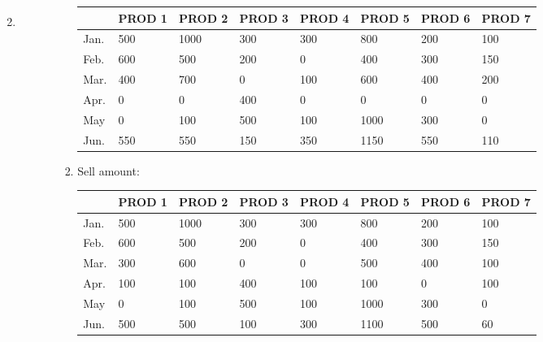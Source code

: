 \documentclass[12pt,a4paper]{article}
\makeatletter
\newtheorem*{solution}{Solution}
\theoremstyle{definition}
\renewenvironment{solution}[1][Solution] {\par\pushQED{\qed}\normalfont\topsep6\p@\@plus6\p@\relax\trivlist\item[\hskip\labelsep\bfseries#1\@addpunct{.}]\ignorespaces}{\popQED\endtrivlist\@endpefalse} \makeatother
\makeatother
\begin{document}
\begin{enumerate}
\begin{solution}
\begin{enumerate}
\begin{enumerate}
\begin{enumerate}
					\begin{table}[htbp]
						\scriptsize
						\centering
						\renewcommand\arraystretch{1.1}
						\begin{tabular}{m{} m{0.09\textwidth}<{\centering} m{}<{\centering} m{}<{\centering} m{}<{\centering} m{}<{\centering} m{}<{\centering} m{}<{\centering}}
							\hline
							& \textbf{PROD 1} & \textbf{PROD 2} & \textbf{PROD 3} & \textbf{PROD 4} & \textbf{PROD 5} & \textbf{PROD 6} &  \textbf{PROD 7} \\\hline
							Jan. & 500 & 1000 & 300 & 300 & 800 & 200  & 100 \\
							Feb. & 600 & 500 & 200 & 0 & 400 & 300 & 150 \\
							Mar. & 400 & 700 & 0 & 100 & 600 & 400 & 200 \\
							Apr. & 0 & 0 & 400 & 0 &0 & 0  & 0 \\
							May & 0 & 100 & 500 & 100 & 1000 & 300 & 0 \\
							Jun. & 550 & 550 & 150 & 350 & 1150 & 550 & 110 \\
							\hline
						\end{tabular}
					\end{table}
					
					\item Sell amount:
					
					\begin{table}[htbp]
						\scriptsize
						\centering
						\renewcommand\arraystretch{1.1}
						\begin{tabular}{m{} m{}<{\centering} m{}<{\centering} m{}<{\centering} m{}<{\centering} m{}<{\centering} m{}<{\centering} m{}<{\centering}}
							\hline
							& \textbf{PROD 1} & \textbf{PROD 2} & \textbf{PROD 3} & \textbf{PROD 4} & \textbf{PROD 5} & \textbf{PROD 6} &  \textbf{PROD 7} \\\hline
							Jan. & 500&1000&300&300&800&200&100\\
							Feb. & 600 & 500 & 200 & 0 & 400 & 300 & 150 \\
							Mar. & 300 & 600 & 0 & 0 & 500 & 400 & 100 \\
							Apr. & 100 & 100 & 400 & 100 &100 & 0  & 100 \\
							May & 0 & 100 & 500 & 100 & 1000 & 300 & 0 \\
							Jun. & 500 & 500 & 100 & 300 & 1100 & 500 & 60 \\
							\hline
						\end{tabular}
					\end{table}
					

\end{enumerate}
\end{enumerate}
\end{enumerate}
\end{solution}
\end{enumerate}
\end{document}
